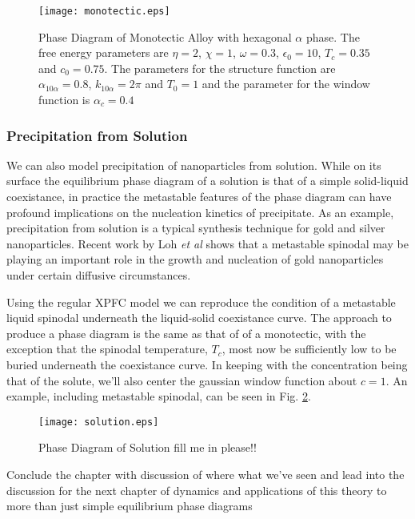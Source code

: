 \begin{figure}
    \centering
	\texttt{[image: monotectic.eps]}
	\caption{
        \label{monotectic} Phase Diagram of Monotectic Alloy with hexagonal
        $\alpha$ phase. The free energy parameters are $\eta = 2$, $\chi=1$,
        $\omega=0.3$, $\epsilon_0 = 10$, $T_c = 0.35$ and $c_0 = 0.75$. The
        parameters for the structure function are $\alpha_{10\alpha} = 0.8$,
        $k_{10\alpha} = 2\pi$ and $T_0 = 1$ and the parameter for the window
        function is $\alpha_c = 0.4$
    }
\end{figure}

\subsubsection{Precipitation from Solution} %

We can also model precipitation of nanoparticles from solution. While on its
surface the equilibrium phase diagram of a solution is that of a simple
solid-liquid coexistance, in practice the metastable features of the phase
diagram can have profound implications on the nucleation kinetics of
precipitate. As an example, precipitation from solution is a typical synthesis
technique for gold and silver nanoparticles. Recent work by Loh \textit{et al}
shows that a metastable spinodal may be playing an important role in the growth
and nucleation of gold nanoparticles under certain diffusive circumstances.

Using the regular XPFC model we can reproduce the condition of a metastable
liquid spinodal underneath the liquid-solid coexistance curve. The approach to
produce a phase diagram is the same as that of of a monotectic, with the
exception that the spinodal temperature, $T_c$, most now be sufficiently low to
be buried underneath the coexistance curve. In keeping with the concentration
being that of the solute, we'll also center the gaussian window function about
$c = 1$. An example, including metastable spinodal, can be seen in Fig.
\ref{precip}.

\begin{figure}
    \centering	
    \texttt{[image: solution.eps]}
	\caption{
        \label{precip} Phase Diagram of Solution \color{ForestGreen} fill
        me in please!!
    }
\end{figure}


{
    \color{ForestGreen} Conclude the chapter with discussion of where what we've
    seen and lead into the discussion for the next chapter of dynamics and
    applications of this theory to more than just simple equilibrium 
    phase diagrams
}
